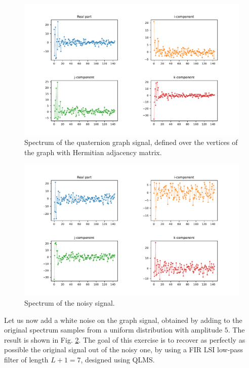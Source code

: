 \begin{figure}
    \centering
    \includegraphics[width=\linewidth]{Figures/uk_example/uk_spectrum_hermitian.pdf}
    \caption{Spectrum of the quaternion graph signal, defined over the vertices of the graph with Hermitian adjacency matrix.}
    \label{fig:uk_qgsp_spectrum_hermitian}
\end{figure}

\begin{figure}
    \centering
    \includegraphics[width=\linewidth]{Figures/uk_example/uk_spectrum_noisy.pdf}
    \caption{Spectrum of the noisy signal.}
    \label{fig:uk_spectrum_noisy}
\end{figure}

Let us now add a white noise on the graph signal, obtained by adding to the original spectrum samples from a uniform distribution with amplitude $5$. The result is shown in Fig. \ref{fig:uk_spectrum_noisy}. The goal of this exercise is to recover as perfectly as possible the original signal out of the noisy one, by using a FIR LSI low-pass filter of length $L+1 = 7$, designed using QLMS.

